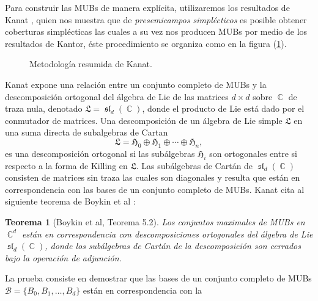 \documentclass[a4paper,11pt]{report}
\DeclareMathOperator{\C}{\mathbb{C}}
\DeclareMathOperator{\Sl}{\mathfrak{sl}}
\newtheorem{theorem}{Teorema}
\begin{document}
  Para construir las MUBs de manera explícita, utilizaremos
  los resultados de Kanat \cite{abdukhalikov2015}, quien nos
  muestra que de \textit{presemicampos simplécticos} es
  posible obtener coberturas simplécticas las cuales a su vez
  nos producen MUBs por medio de los resultados de Kantor,
  éste procedimiento se organiza como en la figura
  (\ref{diag:kanat}). 
  \begin{figure}[h]
    \centering
    \caption{Metodología resumida de Kanat.}
    \label{diag:kanat}
  \end{figure}
  Kanat expone una relación entre un conjunto completo de
  MUBs y la descomposición ortogonal del álgebra de Lie de
  las matrices $d \times d$ sobre $\C$ de traza nula,
  denotado $\mathfrak{L} = \Sl_d(\C)$, donde el producto de
  Lie está dado por el conmutador de matrices. Una
  descomposición de un álgebra de Lie simple $\mathfrak{L}$
  en una suma directa de subalgebras de Cartan
  \begin{equation}
    \mathfrak{L}
    = \mathfrak{H}_0 \oplus \mathfrak{H}_1 \oplus \cdots
    \oplus \mathfrak{H}_n,
  \end{equation}
  es una descomposición ortogonal si las subálgebras
  $\mathfrak{H}_i$ son ortogonales entre si respecto a la
  forma de Killing en $\mathfrak{L}$.  Las subálgebras de
  Cartán de $\Sl_d(\C)$ consisten de matrices sin traza las
  cuales son diagonales y resulta que están en
  correspondencia con las bases de un conjunto completo de
  MUBs. Kanat cita al siguiente teorema de Boykin et al
  \cite{boykin2005}:
  \begin{theorem}[Boykin et al, Teorema 5.2]
    \label{thm:boykin}
    Los conjuntos maximales de MUBs en $\C^{d}$ están en
    correspondencia con descomposiciones ortogonales del
    álgebra de Lie $\Sl_d(\C)$, donde los subálgebras de
    Cartán de la descomposición son cerrados bajo la
    operación de adjunción.
  \end{theorem}
  La prueba consiste en demostrar que las bases de un
  conjunto completo de MUBs $\mathcal B =
  \{B_0,B_1,\ldots,B_d\}$ están en correspondencia con la
\end{document}
